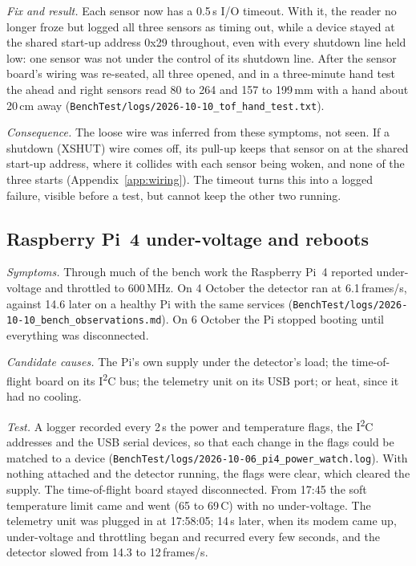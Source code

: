 \emph{Fix and result.} Each sensor now has a 0.5\,s I/O timeout. With it, the reader no longer froze but logged all three sensors as timing out, while a device stayed at the shared start-up address 0x29 throughout, even with every shutdown line held low: one sensor was not under the control of its shutdown line. After the sensor board's wiring was re-seated, all three opened, and in a three-minute hand test the ahead and right sensors read 80 to 264 and 157 to 199\,mm with a hand about 20\,cm away (\texttt{BenchTest/\allowbreak{}logs/\allowbreak{}2026-10-10\_\allowbreak{}tof\_\allowbreak{}hand\_\allowbreak{}test.txt}).

\emph{Consequence.} The loose wire was inferred from these symptoms, not seen. If a shutdown (XSHUT) wire comes off, its pull-up keeps that sensor on at the shared start-up address, where it collides with each sensor being woken, and none of the three starts (Appendix~\ref{app:wiring}). The timeout turns this into a logged failure, visible before a test, but cannot keep the other two running.

\subsection{Raspberry Pi~4 under-voltage and reboots}
\label{sec:inv-power}

\emph{Symptoms.} Through much of the bench work the Raspberry Pi~4 reported under-voltage and throttled to 600\,MHz. On 4 October the detector ran at 6.1\,frames/s, against 14.6 later on a healthy Pi with the same services (\texttt{BenchTest/\allowbreak{}logs/\allowbreak{}2026-10-10\_\allowbreak{}bench\_\allowbreak{}observations.md}). On 6 October the Pi stopped booting until everything was disconnected.

\emph{Candidate causes.} The Pi's own supply under the detector's load; the time-of-flight board on its I\textsuperscript{2}C bus; the telemetry unit on its USB port; or heat, since it had no cooling.

\emph{Test.} A logger recorded every 2\,s the power and temperature flags, the I\textsuperscript{2}C addresses and the USB serial devices, so that each change in the flags could be matched to a device (\texttt{BenchTest/\allowbreak{}logs/\allowbreak{}2026-10-06\_\allowbreak{}pi4\_\allowbreak{}power\_\allowbreak{}watch.log}). With nothing attached and the detector running, the flags were clear, which cleared the supply. The time-of-flight board stayed disconnected. From 17:45 the soft temperature limit came and went (65 to 69\,\textdegree C) with no under-voltage. The telemetry unit was plugged in at 17:58:05; 14\,s later, when its modem came up, under-voltage and throttling began and recurred every few seconds, and the detector slowed from 14.3 to 12\,frames/s.

